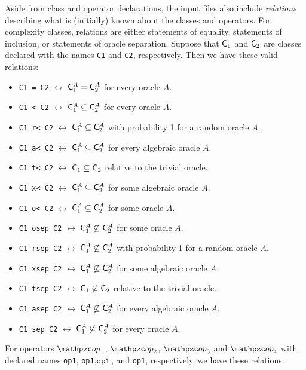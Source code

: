 Aside from class and operator declarations, the input files also include
\textit{relations} describing what is (initially) known about the classes and
operators. For complexity classes, relations are either statements of equality,
statements of inclusion, or statements of oracle separation. Suppose that
$\mathsf{C}_1$ and $\mathsf{C}_2$ are classes declared with the names \texttt{C1} and
\texttt{C2}, respectively. Then we have these valid relations:
\begin{itemize}
\item \texttt{C1 = C2} $\leftrightarrow$ $\mathsf{C}_1^A=\mathsf{C}_2^A$ for every oracle 
  $A$.
\item \texttt{C1 < C2} $\leftrightarrow$ $\mathsf{C}_1^A\subseteq\mathsf{C}_2^A$ for every
  oracle $A$.
\item \texttt{C1 r< C2} $\leftrightarrow$ $\mathsf{C}_1^A\subseteq\mathsf{C}_2^A$ with 
  probability 1 for a random oracle $A$.
\item \texttt{C1 a< C2} $\leftrightarrow$ $\mathsf{C}_1^A\subseteq\mathsf{C}_2^A$ for 
  every algebraic oracle $A$.
\item \texttt{C1 t< C2} $\leftrightarrow$ $\mathsf{C}_1\subseteq\mathsf{C}_2$ relative to 
  the trivial oracle.
\item \texttt{C1 x< C2} $\leftrightarrow$ $\mathsf{C}_1^A\subseteq\mathsf{C}_2^A$ for some
  algebraic oracle $A$.
\item \texttt{C1 o< C2} $\leftrightarrow$ $\mathsf{C}_1^A\subseteq\mathsf{C}_2^A$ for some
  oracle $A$.
\item \texttt{C1 osep C2} $\leftrightarrow$ $\mathsf{C}_1^A\not\subseteq\mathsf{C}_2^A$ 
  for some oracle $A$.
\item \texttt{C1 rsep C2} $\leftrightarrow$ $\mathsf{C}_1^A\not\subseteq\mathsf{C}_2^A$ 
  with probability 1 for a random oracle $A$.
\item \texttt{C1 xsep C2} $\leftrightarrow$ $\mathsf{C}_1^A\not\subseteq\mathsf{C}_2^A$ 
  for some algebraic oracle $A$.
\item \texttt{C1 tsep C2} $\leftrightarrow$ $\mathsf{C}_1\not\subseteq\mathsf{C}_2$ 
  relative to the trivial oracle.
\item \texttt{C1 asep C2} $\leftrightarrow$ $\mathsf{C}_1^A\not\subseteq\mathsf{C}_2^A$ 
  for every algebraic oracle $A$.
\item \texttt{C1 sep C2} $\leftrightarrow$ $\mathsf{C}_1^A\not\subseteq\mathsf{C}_2^A$ for
  every oracle $A$.
\end{itemize}
For operators $\op_1$, $\op_2$, $\op_3$ and $\op_4$ with declared names
\texttt{op1}, \texttt{op1}$, \texttt{op1}$, and \texttt{op1},
respectively, we have these relations:
